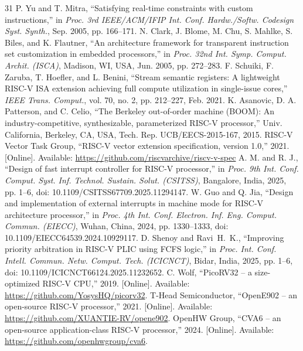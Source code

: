 \documentclass[letterpaper,journal]{IEEEtran}
\begin{document}
\begin{thebibliography}{31}
 P. Yu and T. Mitra, ``Satisfying real-time constraints with custom instructions,'' in \textit{Proc. 3rd IEEE/ACM/IFIP Int. Conf. Hardw./Softw. Codesign Syst. Synth.}, Sep. 2005, pp. 166--171.
 N. Clark, J. Blome, M. Chu, S. Mahlke, S. Biles, and K. Flautner, ``An architecture framework for transparent instruction set customization in embedded processors,'' in \textit{Proc. 32nd Int. Symp. Comput. Archit. (ISCA)}, Madison, WI, USA, Jun. 2005, pp. 272--283.
 F. Schuiki, F. Zaruba, T. Hoefler, and L. Benini, ``Stream semantic registers: A lightweight RISC-V ISA extension achieving full compute utilization in single-issue cores,'' \textit{IEEE Trans. Comput.}, vol. 70, no. 2, pp. 212--227, Feb. 2021.
 K. Asanovic, D. A. Patterson, and C. Celio, ``The Berkeley out-of-order machine (BOOM): An industry-competitive, synthesizable, parameterized RISC-V processor,'' Univ. California, Berkeley, CA, USA, Tech. Rep. UCB/EECS-2015-167, 2015.
 RISC-V Vector Task Group, ``RISC-V vector extension specification, version 1.0,'' 2021. [Online]. Available: \url{https://github.com/riscvarchive/riscv-v-spec}
 A. M. and R. J., ``Design of fast interrupt controller for RISC-V processor,'' in \textit{Proc. 9th Int. Conf. Comput. Syst. Inf. Technol. Sustain. Solut. (CSITSS)}, Bangalore, India, 2025, pp. 1--6, doi: 10.1109/CSITSS67709.2025.11294147.
 W. Guo and Q. Jia, ``Design and implementation of external interrupts in machine mode for RISC-V architecture processor,'' in \textit{Proc. 4th Int. Conf. Electron. Inf. Eng. Comput. Commun. (EIECC)}, Wuhan, China, 2024, pp. 1330--1333, doi: 10.1109/EIECC64539.2024.10929117.
 D. Shenoy and Ravi~H.~K., ``Improving priority arbitration in RISC-V PLIC using FCFS logic,'' in \textit{Proc. Int. Conf. Intell. Commun. Netw. Comput. Tech. (ICICNCT)}, Bidar, India, 2025, pp. 1--6, doi: 10.1109/ICICNCT66124.2025.11232652.
 C. Wolf, ``PicoRV32 -- a size-optimized RISC-V CPU,'' 2019. [Online]. Available: \url{https://github.com/YosysHQ/picorv32}.
 T-Head Semiconductor, ``OpenE902 -- an open-source RISC-V processor,'' 2021. [Online]. Available: \url{https://github.com/XUANTIE-RV/opene902}.
 OpenHW Group, ``CVA6 -- an open-source application-class RISC-V processor,'' 2024. [Online]. Available: \url{https://github.com/openhwgroup/cva6}.
\end{thebibliography}
\end{document}
